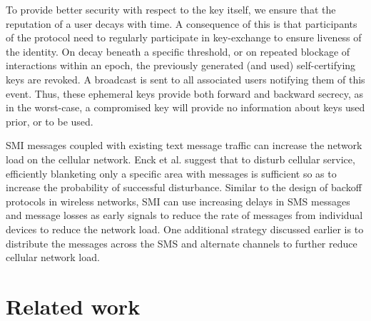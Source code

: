 \documentclass[letterpaper,twocolumn]{sig-alternate}
\begin{document}
\vspace{1mm}
 To provide better security with respect to the key itself, we ensure that the reputation of a user decays with time. A consequence of this is that participants of the protocol need to regularly participate in key-exchange to ensure liveness of the identity. On decay beneath a specific threshold, or on repeated blockage of interactions within an epoch, the previously generated (and used) self-certifying keys are revoked. A broadcast is sent to all associated users notifying them of this event. Thus, these ephemeral keys provide both forward and backward secrecy, as in the worst-case, a compromised key will provide no information about keys used prior, or to be used. 

\vspace{1mm}
 SMI messages coupled with existing text message traffic can increase the network load on the cellular network. Enck et al. \cite{enck2005exploiting} suggest that to disturb cellular service, efficiently blanketing only a specific area with messages is sufficient so as to increase the probability of successful disturbance. Similar to the design of backoff protocols in wireless networks, SMI can use increasing delays in SMS messages and message losses as early signals to reduce the rate of messages from individual devices to reduce the network load. One additional strategy discussed earlier is to distribute the messages across the SMS and alternate channels to further reduce cellular network load.



 

\section{Related work}
\end{document}
